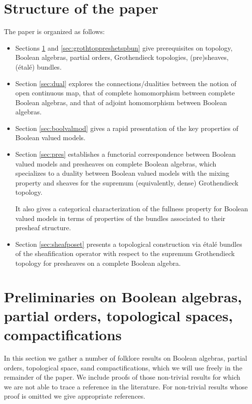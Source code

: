 \documentclass[11pt]{amsart}
\theoremstyle{plain}
\theoremstyle{definition}
\theoremstyle{plain}
\theoremstyle{remark}
\newcommand{\0}{\mathsf{0}}
\renewcommand{\1}{\mathsf{1}}
\renewcommand{\2}{\mathsf{2}}
\theoremstyle{definition}
\begin{document}
\section*{Structure of the paper}
The paper is organized as follows:
\begin{itemize}
\item Sections \ref{sec:prereqbatopsppreord} and \ref{sec:grothtoppreshetspbun} give prerequisites on topology, Boolean algebras, partial orders, Grothendieck topologies, (pre)sheaves, (\'etal\'e) bundles. 

\item Section \ref{sec:dual} explores the connections/dualities between the notion of open continuous map, that of complete homomorphism between complete Boolean algebras, and that of adjoint homomorphism between Boolean algebras.

\item Section \ref{sec:boolvalmod} gives a rapid presentation of the key properties of Boolean valued models.

\item Section \ref{sec:pres} establishes a functorial correspondence between Boolean valued models and presheaves on complete Boolean algebras, which specializes to a duality between Boolean valued models with the mixing property and sheaves for the supremum (equivalently, dense) Grothendieck topology.

It also gives a categorical characterization of the fullness property for Boolean valued models in terms of properties of the bundles associated to their presheaf structure.

\item Section \ref{sec:sheafposet} presents a topological construction via \'etal\'e bundles of the sheafification operator with respect to the supremum Grothendieck topology for presheaves on a complete Boolean algebra.
\end{itemize}


\tableofcontents




\section{Preliminaries on Boolean algebras, partial orders, topological spaces, compactifications}\label{sec:prereqbatopsppreord}

In this section we gather a number of folklore results on Boolean algebras, partial orders, topological space, sand compactifications, which we will use freely in the remainder of the paper. We include proofs of those non-trivial results for which we are not able to trace a reference in the literature. For non-trivial results whose proof is omitted we give appropriate references.
\end{document}
